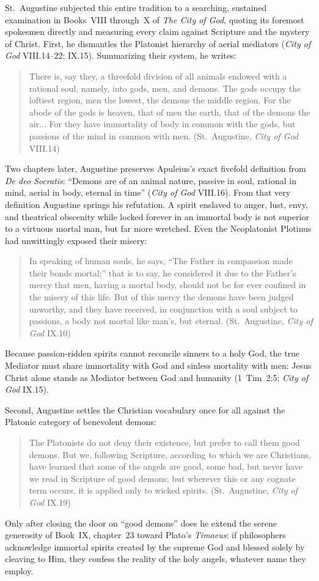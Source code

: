 St.~Augustine subjected this entire tradition to a searching, sustained examination in Books~VIII through~X of \emph{The City of God}, quoting its foremost spokesmen directly and measuring every claim against Scripture and the mystery of Christ. First, he dismantles the Platonist hierarchy of aerial mediators (\emph{City of God} VIII.14--22; IX.15). Summarizing their system, he writes:
\begin{quotation}
There is, say they, a threefold division of all animals endowed with a rational soul, namely, into gods, men, and demons. The gods occupy the loftiest region, men the lowest, the demons the middle region. For the abode of the gods is heaven, that of men the earth, that of the demons the air... For they have immortality of body in common with the gods, but passions of the mind in common with men. (St.~Augustine, \emph{City of God} VIII.14)
\end{quotation}
Two chapters later, Augustine preserves Apuleius's exact fivefold definition from \emph{De deo Socratis}: ``Demons are of an animal nature, passive in soul, rational in mind, aerial in body, eternal in time'' (\emph{City of God} VIII.16). From that very definition Augustine springs his refutation. A spirit enslaved to anger, lust, envy, and theatrical obscenity while locked forever in an immortal body is not superior to a virtuous mortal man, but far more wretched. Even the Neoplatonist Plotinus had unwittingly exposed their misery:
\begin{quotation}
In speaking of human souls, he says, ``The Father in compassion made their bonds mortal;'' that is to say, he considered it due to the Father's mercy that men, having a mortal body, should not be for ever confined in the misery of this life. But of this mercy the demons have been judged unworthy, and they have received, in conjunction with a soul subject to passions, a body not mortal like man's, but eternal. (St.~Augustine, \emph{City of God} IX.10)
\end{quotation}
Because passion-ridden spirits cannot reconcile sinners to a holy God, the true Mediator must share immortality with God and sinless mortality with men: Jesus Christ alone stands as Mediator between God and humanity (1~Tim~2:5; \emph{City of God} IX.15).

Second, Augustine settles the Christian vocabulary once for all against the Platonic category of benevolent demons:
\begin{quotation}
The Platonists do not deny their existence, but prefer to call them good demons. But we, following Scripture, according to which we are Christians, have learned that some of the angels are good, some bad, but never have we read in Scripture of good demons; but wherever this or any cognate term occurs, it is applied only to wicked spirits. (St.~Augustine, \emph{City of God} IX.19)
\end{quotation}
Only after closing the door on ``good demons'' does he extend the serene generosity of Book~IX, chapter~23 toward Plato's \emph{Timaeus}: if philosophers acknowledge immortal spirits created by the supreme God and blessed solely by cleaving to Him, they confess the reality of the holy angels, whatever name they employ.

